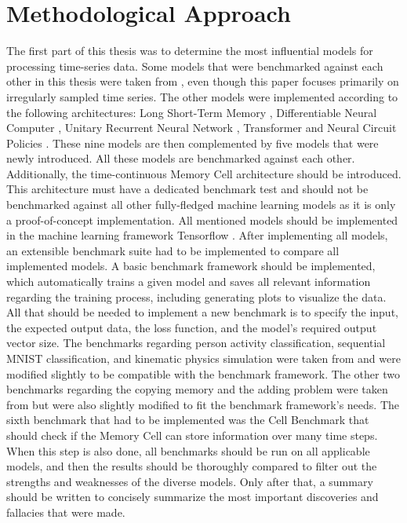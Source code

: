 \documentclass[draft,final]{vutinfth} %
\begin{document}
    \section{Methodological Approach}
    The first part of this thesis was to determine the most influential models for processing time-series data.
    Some models that were benchmarked against each other in this thesis were taken from \cite{ODELSTM}, even though this paper focuses primarily on irregularly sampled time series.
    The other models were implemented according to the following architectures: Long Short-Term Memory \cite{LSTM}, Differentiable Neural Computer \cite{DNC}, Unitary Recurrent Neural Network \cite{EfficientUnitaryRNNs}, Transformer \cite{Transformer} and Neural Circuit Policies \cite{NCP}.
    These nine models are then complemented by five models that were newly introduced.
    All these models are benchmarked against each other.
    Additionally, the time-continuous Memory Cell architecture should be introduced.
    This architecture must have a dedicated benchmark test and should not be benchmarked against all other fully-fledged machine learning models as it is only a proof-of-concept implementation.
    All mentioned models should be implemented in the machine learning framework Tensorflow \cite{Tensorflow}.
    After implementing all models, an extensible benchmark suite had to be implemented to compare all implemented models.
    A basic benchmark framework should be implemented, which automatically trains a given model and saves all relevant information regarding the training process, including generating plots to visualize the data.
    All that should be needed to implement a new benchmark is to specify the input, the expected output data, the loss function, and the model's required output vector size.
    The benchmarks regarding person activity classification, sequential MNIST classification, and kinematic physics simulation were taken from \cite{ODELSTM} and were modified slightly to be compatible with the benchmark framework.
    The other two benchmarks regarding the copying memory and the adding problem were taken from \cite{UnitaryRNNs} but were also slightly modified to fit the benchmark framework's needs.
    The sixth benchmark that had to be implemented was the Cell Benchmark that should check if the Memory Cell can store information over many time steps.
    When this step is also done, all benchmarks should be run on all applicable models, and then the results should be thoroughly compared to filter out the strengths and weaknesses of the diverse models.
    Only after that, a summary should be written to concisely summarize the most important discoveries and fallacies that were made.
\end{document}
